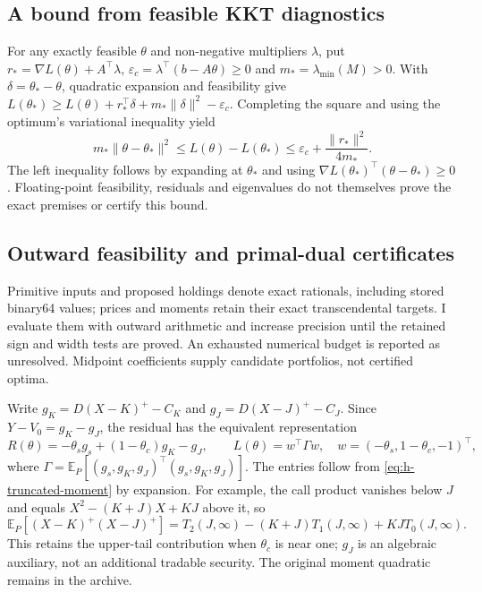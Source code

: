 \documentclass[11pt]{article}
\begin{document}
\subsection{A bound from feasible KKT diagnostics}

For any exactly feasible $\theta$ and non-negative multipliers
$\lambda$, put $r_*=\nabla L(\theta)+A^\top\lambda$,
$\varepsilon_c=\lambda^\top(b-A\theta)\geq0$ and
$m_*=\lambda_{\min}(M)>0$. With $\delta=\theta_*-\theta$,
quadratic expansion and feasibility give
$L(\theta_*)\geq L(\theta)+r_*^\top\delta+
m_*\|\delta\|^2-\varepsilon_c$. Completing the square and using
the optimum's variational inequality yield
\begin{equation}
 m_*\|\theta-\theta_*\|^2
 \leq L(\theta)-L(\theta_*)
 \leq \varepsilon_c+\frac{\|r_*\|^2}{4m_*}.
 \label{eq:h-kkt-risk-bound}
\end{equation}
The left inequality follows by expanding at $\theta_*$ and
using $\nabla L(\theta_*)^\top(\theta-\theta_*)\geq0$.
Floating-point feasibility, residuals and eigenvalues do not themselves
prove the exact premises or certify this bound.

\subsection{Outward feasibility and primal-dual certificates}
\label{app:h-validated-risk}

Primitive inputs and proposed holdings denote exact rationals, including
stored binary64 values; prices and moments retain their exact
transcendental targets. I evaluate them with outward arithmetic and
increase precision until the retained sign and width tests are proved.
An exhausted numerical budget is reported as unresolved.
Midpoint coefficients supply candidate portfolios, not certified optima.

Write $g_K=D(X-K)^+-C_K$ and $g_J=D(X-J)^+-C_J$.
Since $Y-V_0=g_K-g_J$, the residual has the equivalent representation
\begin{equation}
 R(\theta)=-\theta_sg_s+(1-\theta_c)g_K-g_J,
 \qquad L(\theta)=w^\top\Gamma w,
 \quad w=(-\theta_s,1-\theta_c,-1)^\top,
 \label{eq:h-stable-gain-risk}
\end{equation}
where $\Gamma=\mathbb E_P[(g_s,g_K,g_J)^\top(g_s,g_K,g_J)]$.
The entries follow from \eqref{eq:h-truncated-moment} by expansion.
For example, the call product vanishes below $J$ and equals
$X^2-(K+J)X+KJ$ above it, so
\begin{equation}
 \mathbb E_P[(X-K)^+(X-J)^+]
 =T_2(J,\infty)-(K+J)T_1(J,\infty)+KJ T_0(J,\infty).
 \label{eq:h-upper-call-cross-moment}
\end{equation}
This retains the upper-tail contribution when $\theta_c$ is near one;
$g_J$ is an algebraic auxiliary, not an additional tradable security.
The original moment quadratic remains in the archive.
\end{document}
